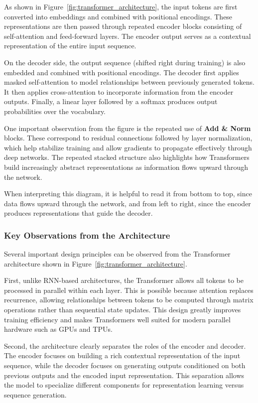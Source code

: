 \documentclass[11pt]{article}
\begin{document}
As shown in Figure~\ref{fig:transformer_architecture}, the input tokens are first converted into embeddings and combined with positional encodings. These representations are then passed through repeated encoder blocks consisting of self-attention and feed-forward layers. The encoder output serves as a contextual representation of the entire input sequence.

On the decoder side, the output sequence (shifted right during training) is also embedded and combined with positional encodings. The decoder first applies masked self-attention to model relationships between previously generated tokens. It then applies cross-attention to incorporate information from the encoder outputs. Finally, a linear layer followed by a softmax produces output probabilities over the vocabulary.

One important observation from the figure is the repeated use of \textbf{Add \& Norm} blocks. These correspond to residual connections followed by layer normalization, which help stabilize training and allow gradients to propagate effectively through deep networks. The repeated stacked structure also highlights how Transformers build increasingly abstract representations as information flows upward through the network.

When interpreting this diagram, it is helpful to read it from bottom to top, since data flows upward through the network, and from left to right, since the encoder produces representations that guide the decoder.

\subsubsection{Key Observations from the Architecture}

Several important design principles can be observed from the Transformer architecture shown in Figure~\ref{fig:transformer_architecture}.

First, unlike RNN-based architectures, the Transformer allows all tokens to be processed in parallel within each layer. This is possible because attention replaces recurrence, allowing relationships between tokens to be computed through matrix operations rather than sequential state updates. This design greatly improves training efficiency and makes Transformers well suited for modern parallel hardware such as GPUs and TPUs.

Second, the architecture clearly separates the roles of the encoder and decoder. The encoder focuses on building a rich contextual representation of the input sequence, while the decoder focuses on generating outputs conditioned on both previous outputs and the encoded input representation. This separation allows the model to specialize different components for representation learning versus sequence generation.
\end{document}
